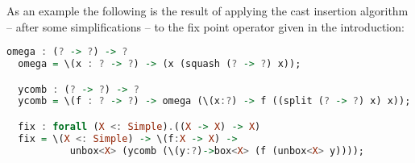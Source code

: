 As an example the following is the result of applying the cast
insertion algorithm -- after some simplifications -- to the fix point
operator given in the introduction:
\begin{lstlisting}[language=Haskell]
  omega : (? -> ?) -> ?
  omega = \(x : ? -> ?) -> (x (squash (? -> ?) x));

  ycomb : (? -> ?) -> ?
  ycomb = \(f : ? -> ?) -> omega (\(x:?) -> f ((split (? -> ?) x) x));

  fix : forall (X <: Simple).((X -> X) -> X)
  fix = \(X <: Simple) -> \(f:X -> X) ->
           unbox<X> (ycomb (\(y:?)->box<X> (f (unbox<X> y))));
\end{lstlisting}

